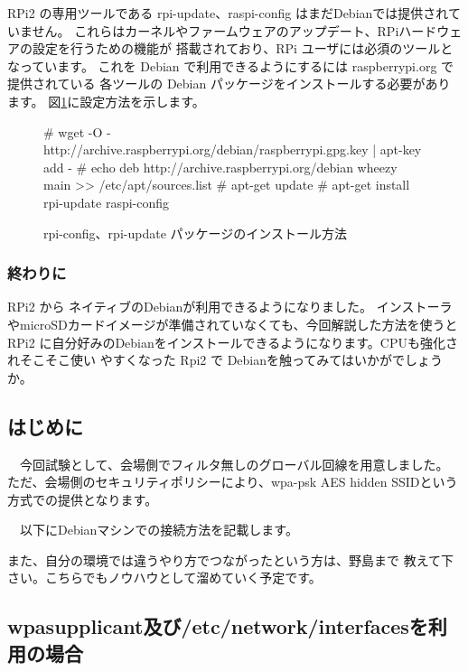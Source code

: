 \documentclass[mingoth,a4paper]{jsarticle}
\begin{document}
RPi2 の専用ツールである rpi-update、raspi-config はまだDebianでは提供されていません。
これらはカーネルやファームウェアのアップデート、RPiハードウェアの設定を行うための機能が
搭載されており、RPi ユーザには必須のツールとなっています。
これを Debian で利用できるようにするには raspberrypi.org で提供されている 各ツールの
Debian パッケージをインストールする必要があります。
図\ref{fig:rpirep}に設定方法を示します。

\begin{figure}[htbp]
\begin{commandline}
# wget -O - http://archive.raspberrypi.org/debian/raspberrypi.gpg.key | apt-key add - 
# echo deb http://archive.raspberrypi.org/debian wheezy main >> /etc/apt/sources.list
# apt-get update
# apt-get install rpi-update raspi-config
\end{commandline}
\label{fig:rpirep}
\caption{rpi-config、rpi-update パッケージのインストール方法}
\end{figure}

\subsubsection{終わりに}

RPi2 から ネイティブのDebianが利用できるようになりました。
インストーラやmicroSDカードイメージが準備されていなくても、今回解説した方法を使うと
RPi2 に自分好みのDebianをインストールできるようになります。CPUも強化されそこそこ使い
やすくなった Rpi2 で Debianを触ってみてはいかがでしょうか。

 \subsection{はじめに}

　今回試験として、会場側でフィルタ無しのグローバル回線を用意しました。
ただ、会場側のセキュリティポリシーにより、wpa-psk AES hidden SSIDという
方式での提供となります。

　以下にDebianマシンでの接続方法を記載します。

 また、自分の環境では違うやり方でつながったという方は、野島まで
教えて下さい。こちらでもノウハウとして溜めていく予定です。

 \subsection{wpasupplicant及び/etc/network/interfacesを利用の場合}
\end{document}
